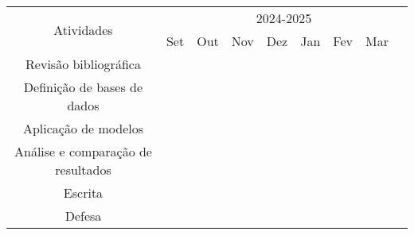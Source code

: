 \documentclass[openany, a4paper,12pt, oneside]{article}
\newcounter{loopcntr}
\newcommand{\on}[1][1]{
  \forloop{loopcntr}{0}{\value{loopcntr}<#1}{&\cellcolor{gray}}
}
\newcommand{\off}[1][1]{
  \forloop{loopcntr}{0}{\value{loopcntr}<#1}{&}
}
\begin{document}
\begin{tabular}{ | c | c | c | c | c | c | c | c | }
  \hline
  \multirow{2}{*}{Atividades} & \multicolumn{8}{c}{2024-2025} \vline                                           \\
  \cline{2-8}                 & Set                                  & Out & Nov & Dez & Jan & Fev & Mar \\
  \hline
  Revis\~{a}o bibliogr\'{a}fica \on[3] \off[5]                                                                  \\
  \hline
  Defini\c{c}\~{a}o de bases de dados \on[1] \off[7]                                                           \\

  \hline
  Aplica\c{c}\~{a}o de modelos \off[1] \on[2] \off[4]                                                          \\
  \hline
  An\'{a}lise e compara\c{c}\~{a}o de resultados \off[3] \on[2] \off[2]                                        \\
  \hline
  Escrita \off[5] \on[2]                                                                                       \\
  \hline
  Defesa \off[6] \on[1]                                                                                        \\
  \hline
\end{tabular}





\end{document}
